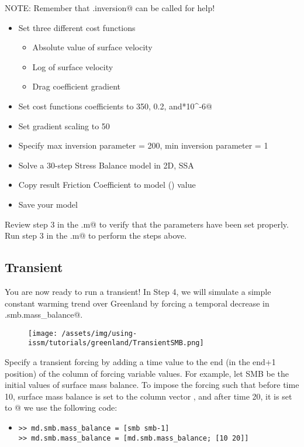 NOTE: Remember that \verb@md.inversion@ can be called for help!
\begin{itemize}
	\item Set three different cost functions
		\begin{itemize}
			\item Absolute value of surface velocity
			\item Log of surface velocity
			\item Drag coefficient gradient
		\end{itemize}
	\item Set cost functions coefficients to 350, 0.2, and*10^-6@
	\item Set gradient scaling to 50
	\item Specify max inversion parameter = 200, min inversion parameter = 1
	\item Solve a 30-step Stress Balance model in 2D, SSA
	\item Copy result Friction Coefficient to model (\verb@md@) value
	\item Save your model
\end{itemize}

Review step 3 in the \verb@runme.m@ to verify that the parameters have been set properly. Run step 3 in the \verb@runme.m@ to perform the steps above.
\subsection{Transient} %
You are now ready to run a transient! In Step 4, we will simulate a simple constant warming trend over Greenland by forcing a temporal decrease in \verb@md.smb.mass_balance@.

\begin{figure}[H]
	\begin{center}
		\texttt{[image: /assets/img/using-issm/tutorials/greenland/TransientSMB.png]}
	\end{center}
\end{figure}

Specify a transient forcing by adding a time value to the end (in the end+1 position) of the column of forcing variable values. For example, let SMB be the initial values of surface mass balance. To impose the forcing such that before time 10, surface mass balance is set to the column vector \verb@smb@, and after time 20, it is set to @ we use the following code:
\begin{itemize}
	\item \begin{verbatim}>> md.smb.mass_balance = [smb smb-1]
>> md.smb.mass_balance = [md.smb.mass_balance; [10 20]]\end{verbatim}
\end{itemize}

